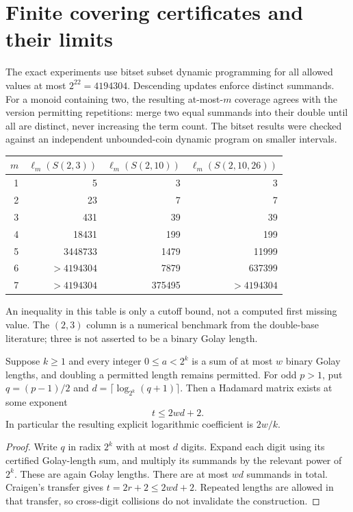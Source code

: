 \section{Finite covering certificates and their limits}
The exact experiments use bitset subset dynamic programming for all
allowed values at most $2^{22}=4194304$. Descending updates enforce
distinct summands. For a monoid containing two, the resulting at-most-$m$
coverage agrees with the version permitting repetitions: merge two equal
summands into their double until all are distinct, never increasing
the term count. The bitset results were checked against an independent
unbounded-coin dynamic program on smaller intervals.

\begin{center}
\begin{tabular}{r r r r}
\toprule
$m$ & $\ell_m(S(2,3))$ & $\ell_m(S(2,10))$ & $\ell_m(S(2,10,26))$\\
\midrule
1 & 5 & 3 & 3\\
2 & 23 & 7 & 7\\
3 & 431 & 39 & 39\\
4 & 18431 & 199 & 199\\
5 & 3448733 & 1479 & 11999\\
6 & $>4194304$ & 7879 & 637399\\
7 & $>4194304$ & 375495 & $>4194304$\\
\bottomrule
\end{tabular}
\end{center}
An inequality in this table is only a cutoff bound, not a computed first
missing value. The $(2,3)$ column is a numerical benchmark from the
double-base literature; three is not asserted to be a binary Golay length.

\begin{proposition}\label{ext:prop:radix}
Suppose $k\ge1$ and every integer $0\le a<2^k$ is a sum of at most $w$ binary Golay
lengths, and doubling a permitted length remains permitted. For odd
$p>1$, put $q=(p-1)/2$ and
$d=\lceil\log_{2^k}(q+1)\rceil$. Then a Hadamard matrix exists at some
exponent
\[
t\le2wd+2.
\]
In particular the resulting explicit logarithmic coefficient is $2w/k$.
\end{proposition}
\begin{proof}
Write $q$ in radix $2^k$ with at most $d$ digits. Expand each digit using
its certified Golay-length sum, and multiply its summands by the relevant
power of $2^k$. These are again Golay lengths. There are at most $wd$
summands in total. Craigen's transfer gives $t=2r+2\le2wd+2$.
Repeated lengths are allowed in that transfer, so cross-digit collisions
do not invalidate the construction.
\end{proof}

